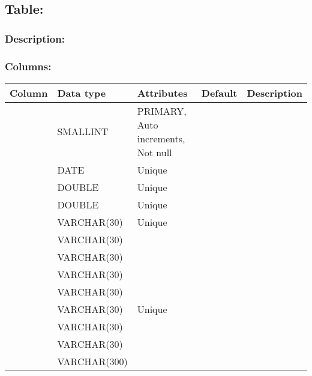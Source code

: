 \documentclass[letterpaper,10pt,english]{sphinxmanual}
\begin{document}
\subsection{Table: }
\label{\detokenize{schema_documentation:table-prospection}}

\subsubsection{Description:}
\label{\detokenize{schema_documentation:id13}}

\subsubsection{Columns:}
\label{\detokenize{schema_documentation:id14}}

\begin{savenotes}\sphinxattablestart
\centering
\begin{tabulary}{\linewidth}[t]{|T|T|T|T|T|}
\hline
\sphinxstyletheadfamily 
Column
&\sphinxstyletheadfamily 
Data type
&\sphinxstyletheadfamily 
Attributes
&\sphinxstyletheadfamily 
Default
&\sphinxstyletheadfamily 
Description
\\
\hline
{}
&
SMALLINT
&
PRIMARY, Auto increments, Not null
&&\\
\hline
{}
&
DATE
&
Unique
&
&\\
\hline
{}
&
DOUBLE
&
Unique
&
&\\
\hline
{}
&
DOUBLE
&
Unique
&
&\\
\hline
{}
&
VARCHAR(30)
&
Unique
&
&\\
\hline
{}
&
VARCHAR(30)
&&
&\\
\hline
{}
&
VARCHAR(30)
&&
&\\
\hline
{}
&
VARCHAR(30)
&&
&\\
\hline
{}
&
VARCHAR(30)
&&
&\\
\hline
{}
&
VARCHAR(30)
&
Unique
&
&\\
\hline
{}
&
VARCHAR(30)
&&
&\\
\hline
{}
&
VARCHAR(30)
&&
&\\
\hline
{}
&
VARCHAR(300)
&&
&\\
\hline
\end{tabulary}
\par
\sphinxattableend\end{savenotes}
\end{document}
